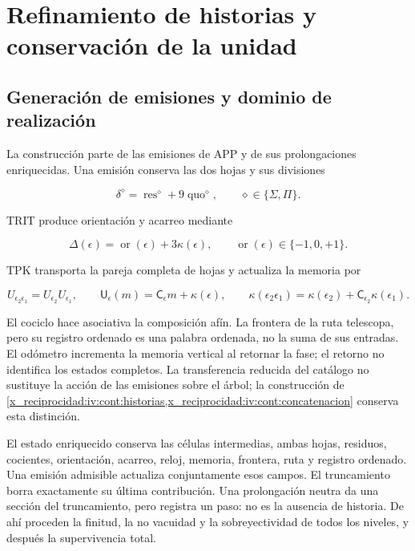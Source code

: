 \chapter{Refinamiento de historias y conservación de la unidad}
\label{x_reciprocidad:nuclear:1}
\section{Generación de emisiones y dominio de realización}

La construcción parte de las emisiones de APP y de sus prolongaciones enriquecidas. Una emisión conserva las dos hojas y sus divisiones

\[
\delta^\diamond=\operatorname{res}^\diamond+9\operatorname{quo}^\diamond,
\qquad \diamond\in\{\Sigma,\Pi\}.
\]

TRIT produce orientación y acarreo mediante

\[
\Delta(\epsilon)=\operatorname{or}(\epsilon)+3\kappa(\epsilon),
\qquad \operatorname{or}(\epsilon)\in\{-1,0,+1\}.
\]

TPK transporta la pareja completa de hojas y actualiza la memoria por

\[
U_{\epsilon_2\epsilon_1}=U_{\epsilon_2}U_{\epsilon_1},\qquad
\mathsf U_\epsilon(m)=\mathsf C_\epsilon m+\kappa(\epsilon),\qquad
\kappa(\epsilon_2\epsilon_1)
=\kappa(\epsilon_2)+\mathsf C_{\epsilon_2}\kappa(\epsilon_1).
\]

El cociclo hace asociativa la composición afín. La frontera de la ruta telescopa, pero su registro ordenado es una palabra ordenada, no la suma de sus entradas. El odómetro incrementa la memoria vertical al retornar la fase; el retorno no identifica los estados completos. La transferencia reducida del catálogo no sustituye la acción de las emisiones sobre el árbol; la construcción de \cref{x_reciprocidad:iv:cont:historias,x_reciprocidad:iv:cont:concatenacion} conserva esta distinción.

El estado enriquecido conserva las células intermedias, ambas hojas, residuos, cocientes, orientación, acarreo, reloj, memoria, frontera, ruta y registro ordenado. Una emisión admisible actualiza conjuntamente esos campos. El truncamiento borra exactamente su última contribución. Una prolongación neutra da una sección del truncamiento, pero registra un paso: no es la ausencia de historia. De ahí proceden la finitud, la no vacuidad y la sobreyectividad de todos los niveles, y después la supervivencia total.

